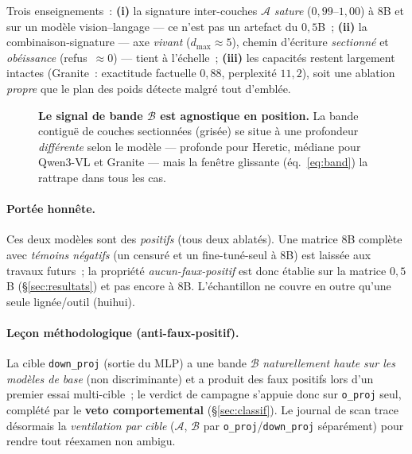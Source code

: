\documentclass[11pt,a4paper]{article}
\theoremstyle{definition}
\theoremstyle{plain}
\begin{document}
\noindent Trois enseignements~: \textbf{(i)} la signature inter-couches $\mathcal{A}$
\emph{sature} ($0{,}99$--$1{,}00$) à $8$B et sur un modèle vision--langage --- ce n'est
pas un artefact du $0{,}5$B~; \textbf{(ii)} la combinaison-signature --- axe
\emph{vivant} ($d_{\max}\approx 5$), chemin d'écriture \emph{sectionné} et
\emph{obéissance} (refus~$\approx 0$) --- tient à l'échelle~; \textbf{(iii)} les
capacités restent largement intactes (Granite~: exactitude factuelle $0{,}88$,
perplexité $11{,}2$), soit une ablation \emph{propre} que le plan des poids détecte
malgré tout d'emblée.

\begin{figure}[H]\centering
{}
\caption{\textbf{Le signal de bande $\mathcal{B}$ est agnostique en position.} La bande
contiguë de couches sectionnées (grisée) se situe à une profondeur \emph{différente}
selon le modèle --- profonde pour Heretic, médiane pour Qwen3-VL et Granite --- mais la
fenêtre glissante (éq.~\eqref{eq:band}) la rattrape dans tous les cas.}
\label{fig:band}
\end{figure}

\paragraph{Portée honnête.} Ces deux modèles sont des \emph{positifs} (tous deux
ablatés). Une matrice $8$B complète avec \emph{témoins négatifs} (un censuré et un
fine-tuné-seul à $8$B) est laissée aux travaux futurs~; la propriété
\emph{aucun-faux-positif} est donc établie sur la matrice $0{,}5$B
(\S\ref{sec:resultats}) et pas encore à $8$B. L'échantillon ne couvre en outre qu'une
seule lignée/outil (huihui).

\paragraph{Leçon méthodologique (anti-faux-positif).} La cible \texttt{down\_proj}
(sortie du MLP) a une bande $\mathcal{B}$ \emph{naturellement haute sur les modèles de
base} (non discriminante) et a produit des faux positifs lors d'un premier essai
multi-cible~; le verdict de campagne s'appuie donc sur \texttt{o\_proj} seul, complété
par le \textbf{veto comportemental} (\S\ref{sec:classif}). Le journal de scan trace
désormais la \emph{ventilation par cible} ($\mathcal{A}$, $\mathcal{B}$ par
\texttt{o\_proj}/\texttt{down\_proj} séparément) pour rendre tout réexamen non ambigu.
\end{document}
